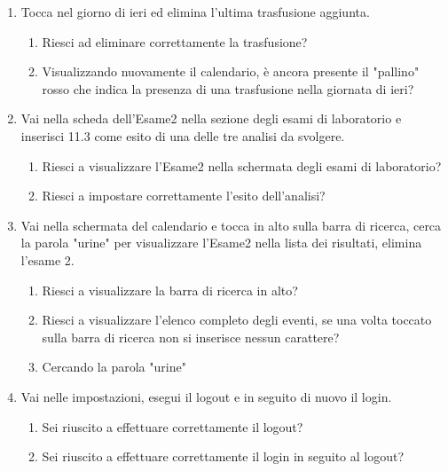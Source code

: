 \documentclass[12pt,a4paper,openright,twoside]{report}
\begin{document}
\begin{enumerate}
    \item Tocca nel giorno di ieri ed elimina l'ultima trasfusione aggiunta.
    \begin{enumerate}
        \item Riesci ad eliminare correttamente la trasfusione?
        \item Visualizzando nuovamente il calendario, è ancora presente il "pallino" rosso che indica la presenza di una trasfusione nella giornata di ieri?
    \end{enumerate}
    
    \item Vai nella scheda dell'Esame2 nella sezione degli esami di laboratorio e inserisci 11.3 come esito di una delle tre analisi da svolgere.
    \begin{enumerate}
        \item Riesci a visualizzare l'Esame2 nella schermata degli esami di laboratorio?
        \item Riesci a impostare correttamente l'esito dell'analisi?
    \end{enumerate}
    
    \item Vai nella schermata del calendario e tocca in alto sulla barra di ricerca, cerca la parola "urine" per visualizzare l'Esame2 nella lista dei risultati, elimina l'esame 2.
    \begin{enumerate}
        \item Riesci a visualizzare la barra di ricerca in alto?
        \item Riesci a visualizzare l'elenco completo degli eventi, se una volta toccato sulla barra di ricerca non si inserisce nessun carattere?
        \item Cercando la parola "urine"
    \end{enumerate}
    
    \item Vai nelle impostazioni, esegui il logout e in seguito di nuovo il login.
    \begin{enumerate}
        \item Sei riuscito a effettuare correttamente il logout?
        \item Sei riuscito a effettuare correttamente il login in seguito al logout?
    \end{enumerate}
    

\end{enumerate}
\end{document}
